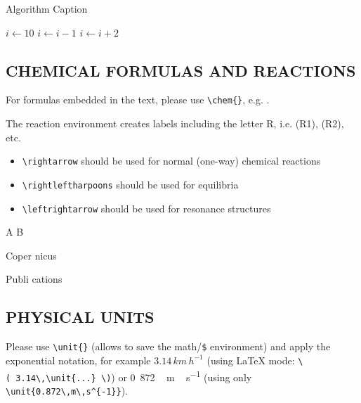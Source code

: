 \documentclass[gc, manuscript]{copernicus}
\begin{document}
\begin{algorithm}
\caption{Algorithm Caption}
\label{a1}
\begin{algorithmic}
\STATE $i\gets 10$
        \STATE $i\gets i-1$
\ELSE
                \STATE $i\gets i+2$
        \ENDIF
\ENDIF
\end{algorithmic}
\end{algorithm}

\subsection{CHEMICAL FORMULAS AND REACTIONS}

For formulas embedded in the text, please use \texttt{\textbackslash{}chem\{\}}, e.g. .

The reaction environment creates labels including the letter R, i.e. (R1), (R2), etc.

\begin{itemize}
\item
  \texttt{\textbackslash{}rightarrow} should be used for normal (one-way) chemical reactions
\item
  \texttt{\textbackslash{}rightleftharpoons} should be used for equilibria
\item
  \texttt{\textbackslash{}leftrightarrow} should be used for resonance structures
\end{itemize}

\begin{reaction}
A \rightarrow B \\
\end{reaction}
\begin{reaction}
Coper \rightleftharpoons nicus \\
\end{reaction}
\begin{reaction}
Publi \leftrightarrow cations
\end{reaction}

\subsection{PHYSICAL UNITS}

Please use \texttt{\textbackslash{}unit\{\}} (allows to save the math/\texttt{\$} environment) and apply the exponential notation, for example \(3.14\,\unit{km\,h^{-1}}\) (using LaTeX mode: \texttt{\textbackslash{}(\ 3.14\textbackslash{},\textbackslash{}unit\{...\}\ \textbackslash{})}) or \unit{0.872\,m\,s^{-1}} (using only \texttt{\textbackslash{}unit\{0.872\textbackslash{},m\textbackslash{},s\^{}\{-1\}\}}).
\end{document}
